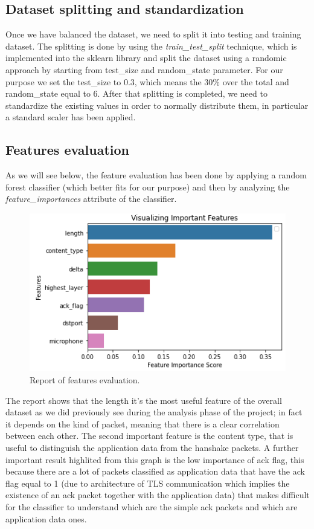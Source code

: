 \documentclass[sigconf]{acmart}
\begin{document}
    \subsection{Dataset splitting and standardization}
    Once we have balanced the dataset, we need to split it into testing and training dataset. The splitting is done by using the \textit{train\_test\_split} technique, which is implemented into the sklearn library and split the dataset using a randomic approach by starting from test\_size and random\_state parameter. For our purpose we set the test\_size to 0.3, which means the 30\% over the total and random\_state equal to 6. After that splitting is completed, we need to standardize the existing values in order to normally distribute them, in particular a standard scaler has been applied.

    \subsection{Features evaluation}
    As we will see below, the feature evaluation has been done by applying a random forest classifier (which better fits for our purpose) and then by analyzing the \textit{feature\_importances} attribute of the classifier.
    \begin{figure}[h!]
        \includegraphics[width=\linewidth]{img/important_features.png}
        \caption{Report of features evaluation.}
        \label{fig:important_features}
    \end{figure}
The report shows that the length it's the most useful feature of the overall dataset as we did previously see during the analysis phase of the project; in fact it depends on the kind of packet, meaning that there is a clear correlation between each other. The second important feature is the content type, that is useful to distinguish the application data from the hanshake packets.
A further important result highlited from this graph is the low importance of ack flag, this because there are a lot of packets classified as application data that have the ack flag equal to 1 (due to architecture of TLS communication which implies the existence of an ack packet together with the application data) that makes difficult for the classifier to understand which are the simple ack packets and which are application data ones.
\end{document}
